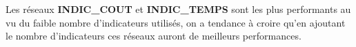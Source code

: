  
  Les réseaux \textbf{INDIC\_COUT} et \textbf{INDIC\_TEMPS} sont les plus performants au vu du faible nombre d'indicateurs utilisés, on a tendance à croire qu'en ajoutant le nombre d'indicateurs ces réseaux auront de meilleurs performances.  

